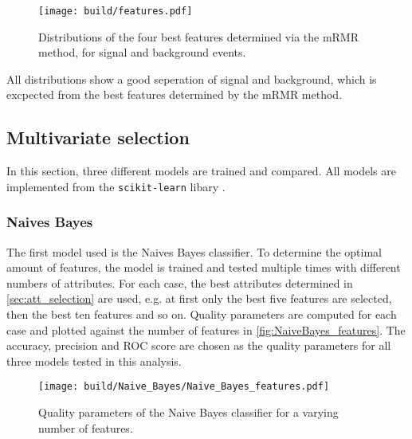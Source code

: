 \begin{figure}[H]
  \centering
  \texttt{[image: build/features.pdf]}
  \caption{Distributions of the four best features determined via the mRMR method, for signal and background events.}
  \label{fig:features}
\end{figure}

All distributions show a good seperation of signal and background, which is excpected
from the best features determined by the mRMR method.

\subsection{Multivariate selection}

In this section, three different models are trained and compared. All models are implemented from the \texttt{scikit-learn}
libary \cite{scikit-learn}.

\subsubsection{Naives Bayes}
\label{sec:NaiveBayes}

The first model used is the Naives Bayes classifier. To determine the optimal amount of
features, the model is trained and tested multiple times with different numbers of attributes.
For each case, the best attributes determined in \autoref{sec:att_selection} are used, e.g. at first 
only the best five features are selected, then the best ten features and so on.
Quality parameters are computed for each case and plotted against the number of features in \autoref{fig:NaiveBayes_features}.
The accuracy, precision and ROC score are chosen as the quality parameters for all three
models tested in this analysis.

\begin{figure}[H]
  \centering
  \texttt{[image: build/Naive\_Bayes/Naive\_Bayes\_features.pdf]}
  \caption{Quality parameters of the Naive Bayes classifier for a varying number of features.}
  \label{fig:NaiveBayes_features}
\end{figure}

